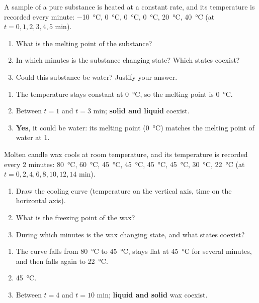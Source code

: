 \begin{exercise}
    A sample of a pure substance is heated at a constant rate, and its temperature is recorded every minute: \qty{-10}{\celsius}, \qty{0}{\celsius}, \qty{0}{\celsius}, \qty{0}{\celsius}, \qty{20}{\celsius}, \qty{40}{\celsius} (at \(t = 0, 1, 2, 3, 4, 5\) min).
    \begin{enumerate}[label=\letraminuscula]
        \item What is the melting point of the substance?
        \item In which minutes is the substance changing state? Which states coexist?
        \item Could this substance be water? Justify your answer.
    \end{enumerate}
    \begin{solu}
        \begin{enumerate}[label=\alph*)]
            \item The temperature stays constant at \qty{0}{\celsius}, so the melting point is \qty{0}{\celsius}.
            \item Between \(t = 1\) and \(t = 3\) min; \textbf{solid and liquid} coexist.
            \item \textbf{Yes}, it could be water: its melting point (\qty{0}{\celsius}) matches the melting point of water at \qty{1}{\atmospher}.
        \end{enumerate}
    \end{solu}
\end{exercise}

\begin{exercise}
    Molten candle wax cools at room temperature, and its temperature is recorded every 2 minutes: \qty{80}{\celsius}, \qty{60}{\celsius}, \qty{45}{\celsius}, \qty{45}{\celsius}, \qty{45}{\celsius}, \qty{45}{\celsius}, \qty{30}{\celsius}, \qty{22}{\celsius} (at \(t = 0, 2, 4, 6, 8, 10, 12, 14\) min).
    \begin{enumerate}[label=\letraminuscula]
        \item Draw the cooling curve (temperature on the vertical axis, time on the horizontal axis).
        \item What is the freezing point of the wax?
        \item During which minutes is the wax changing state, and what states coexist?
    \end{enumerate}
    \begin{solu}
        \begin{enumerate}[label=\alph*)]
            \item The curve falls from \qty{80}{\celsius} to \qty{45}{\celsius}, stays flat at \qty{45}{\celsius} for several minutes, and then falls again to \qty{22}{\celsius}.
            \item \qty{45}{\celsius}.
            \item Between \(t = 4\) and \(t = 10\) min; \textbf{liquid and solid} wax coexist.
        \end{enumerate}
    \end{solu}
\end{exercise}

